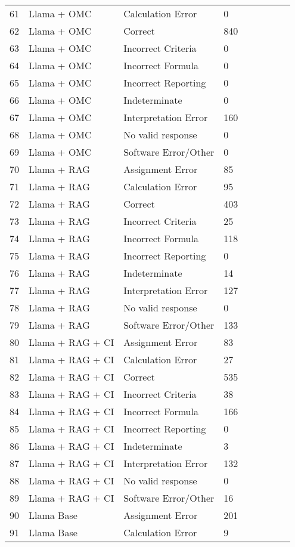\begin{tabular}{|l|l|l|l|l|l|l|l|l|}
61 & Llama + OMC & Calculation Error & 0 \\
62 & Llama + OMC & Correct & 840 \\
63 & Llama + OMC & Incorrect Criteria & 0 \\
64 & Llama + OMC & Incorrect Formula & 0 \\
65 & Llama + OMC & Incorrect Reporting & 0 \\
66 & Llama + OMC & Indeterminate & 0 \\
67 & Llama + OMC & Interpretation Error & 160 \\
68 & Llama + OMC & No valid response & 0 \\
69 & Llama + OMC & Software Error/Other & 0 \\
70 & Llama + RAG & Assignment Error & 85 \\
71 & Llama + RAG & Calculation Error & 95 \\
72 & Llama + RAG & Correct & 403 \\
73 & Llama + RAG & Incorrect Criteria & 25 \\
74 & Llama + RAG & Incorrect Formula & 118 \\
75 & Llama + RAG & Incorrect Reporting & 0 \\
76 & Llama + RAG & Indeterminate & 14 \\
77 & Llama + RAG & Interpretation Error & 127 \\
78 & Llama + RAG & No valid response & 0 \\
79 & Llama + RAG & Software Error/Other & 133 \\
80 & Llama + RAG + CI & Assignment Error & 83 \\
81 & Llama + RAG + CI & Calculation Error & 27 \\
82 & Llama + RAG + CI & Correct & 535 \\
83 & Llama + RAG + CI & Incorrect Criteria & 38 \\
84 & Llama + RAG + CI & Incorrect Formula & 166 \\
85 & Llama + RAG + CI & Incorrect Reporting & 0 \\
86 & Llama + RAG + CI & Indeterminate & 3 \\
87 & Llama + RAG + CI & Interpretation Error & 132 \\
88 & Llama + RAG + CI & No valid response & 0 \\
89 & Llama + RAG + CI & Software Error/Other & 16 \\
90 & Llama Base & Assignment Error & 201 \\
91 & Llama Base & Calculation Error & 9 \\

\end{tabular}
